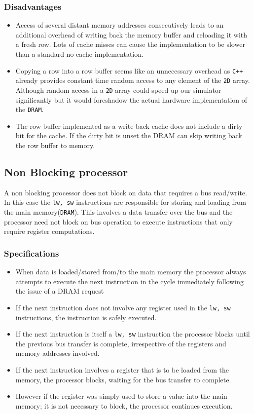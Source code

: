 \documentclass[hidelinks,12pt]{article}
\begin{document}
\subsubsection{Disadvantages}
\begin{itemize}
    \item Access of several distant memory addresses consecutively leads to an additional overhead of writing back the memory buffer and reloading it with a fresh row.
          Lots of cache misses can cause the implementation to be slower than a standard no-cache implementation.
    \item Copying a row into a row buffer seems like an unnecessary overhead as \verb|C++| already provides constant time random access to any element of the \verb|2D| array.
          Although random access in a \verb|2D| array could speed up our simulator significantly but it would foreshadow the actual hardware implementation of the \verb|DRAM|.
    \item The row buffer implemented as a write back cache does not include a dirty bit for the cache. If the dirty bit is unset the DRAM can skip writing back the row buffer to memory.
\end{itemize}

\subsection{Non Blocking processor}
A non blocking processor does not block on data that requires a bus read/write. In this case the \verb|lw, sw| instructions
are responsible for storing and loading from the main memory(\verb|DRAM|). This involves a data transfer over the bus and the processor need not block on
bus operation to execute instructions that only require register computations.
\subsubsection{Specifications}
\begin{itemize}
    \item When data is loaded/stored from/to the main memory the processor always attempts to execute the next instruction in the cycle immediately following the issue of a DRAM request
    \item If the next instruction does not involve any register used in the \verb|lw, sw| instructions, the instruction is safely executed.
    \item If the next instruction is itself a \verb|lw, sw| instruction the processor blocks until the previous bus transfer is complete, irrespective of the registers and memory addresses involved.
    \item If the next instruction involves a register that is to be loaded from the memory, the processor blocks, waiting for the bus transfer to complete.
    \item However if the register was simply used to store a value into the main memory; it is not necessary to block, the processor continues execution.
\end{itemize}
\end{document}
